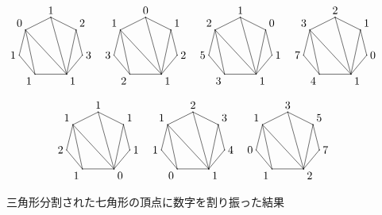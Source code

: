 \documentclass[12pt,twoside,dvipdfm]{jarticle}
\theoremstyle{definition} %
\theoremstyle{definition} %
\theoremstyle{definition} %
\numberwithin{theorem}{section}
\numberwithin{equation}{section}
\numberwithin{figure}{section}
\numberwithin{table}{section}
\begin{document}
\begin{figure}[hbp!]
\[
\begin{xy}
{<0mm,0mm>;<1mm,0mm>:
(  0, 10)*+!D {1}="1",
(  8,  6)*+!LD{2}="2", 
( 10, -2)*+!L {3}="3", 
(  5, -8)*+!LU{1}="4", 
( -5, -8)*+!UR{1}="5",
(-10, -2)*+!R {1}="6",
( -8,  6)*+!DR{0}="7", 
\ar@{-}"1";"2",
\ar@{-}"2";"3",
\ar@{-}"3";"4",
\ar@{-}"4";"5",
\ar@{-}"5";"6",
\ar@{-}"6";"7",
\ar@{-}"7";"1".
\ar@{-}"4";"2",
\ar@{-}"4";"1",
\ar@{-}"4";"7",
\ar@{-}"5";"7".
},
{<30mm,0mm>;<31mm,0mm>:
(  0, 10)*+!D {0}="1",
(  8,  6)*+!LD{1}="2", 
( 10, -2)*+!L {2}="3", 
(  5, -8)*+!LU{1}="4", 
( -5, -8)*+!UR{2}="5",
(-10, -2)*+!R {3}="6",
( -8,  6)*+!DR{1}="7", 
\ar@{-}"1";"2",
\ar@{-}"2";"3",
\ar@{-}"3";"4",
\ar@{-}"4";"5",
\ar@{-}"5";"6",
\ar@{-}"6";"7",
\ar@{-}"7";"1".
\ar@{-}"4";"2",
\ar@{-}"4";"1",
\ar@{-}"4";"7",
\ar@{-}"5";"7".
},
{<60mm,0mm>;<61mm,0mm>:
(  0, 10)*+!D {1}="1",
(  8,  6)*+!LD{0}="2", 
( 10, -2)*+!L {1}="3", 
(  5, -8)*+!LU{1}="4", 
( -5, -8)*+!UR{3}="5",
(-10, -2)*+!R {5}="6",
( -8,  6)*+!DR{2}="7", 
\ar@{-}"1";"2",
\ar@{-}"2";"3",
\ar@{-}"3";"4",
\ar@{-}"4";"5",
\ar@{-}"5";"6",
\ar@{-}"6";"7",
\ar@{-}"7";"1".
\ar@{-}"4";"2",
\ar@{-}"4";"1",
\ar@{-}"4";"7",
\ar@{-}"5";"7".
},
{<90mm,0mm>;<91mm,0mm>:
(  0, 10)*+!D {2}="1",
(  8,  6)*+!LD{1}="2", 
( 10, -2)*+!L {0}="3", 
(  5, -8)*+!LU{1}="4", 
( -5, -8)*+!UR{4}="5",
(-10, -2)*+!R {7}="6",
( -8,  6)*+!DR{3}="7", 
\ar@{-}"1";"2",
\ar@{-}"2";"3",
\ar@{-}"3";"4",
\ar@{-}"4";"5",
\ar@{-}"5";"6",
\ar@{-}"6";"7",
\ar@{-}"7";"1".
\ar@{-}"4";"2",
\ar@{-}"4";"1",
\ar@{-}"4";"7",
\ar@{-}"5";"7".
},
{<15mm,-30mm>;<16mm,-30mm>:
(  0, 10)*+!D {1}="1",
(  8,  6)*+!LD{1}="2", 
( 10, -2)*+!L {1}="3", 
(  5, -8)*+!LU{0}="4", 
( -5, -8)*+!UR{1}="5",
(-10, -2)*+!R {2}="6",
( -8,  6)*+!DR{1}="7", 
\ar@{-}"1";"2",
\ar@{-}"2";"3",
\ar@{-}"3";"4",
\ar@{-}"4";"5",
\ar@{-}"5";"6",
\ar@{-}"6";"7",
\ar@{-}"7";"1".
\ar@{-}"4";"2",
\ar@{-}"4";"1",
\ar@{-}"4";"7",
\ar@{-}"5";"7".
},
{<45mm,-30mm>;<46mm,-30mm>:
(  0, 10)*+!D {2}="1",
(  8,  6)*+!LD{3}="2", 
( 10, -2)*+!L {4}="3", 
(  5, -8)*+!LU{1}="4", 
( -5, -8)*+!UR{0}="5",
(-10, -2)*+!R {1}="6",
( -8,  6)*+!DR{1}="7", 
\ar@{-}"1";"2",
\ar@{-}"2";"3",
\ar@{-}"3";"4",
\ar@{-}"4";"5",
\ar@{-}"5";"6",
\ar@{-}"6";"7",
\ar@{-}"7";"1".
\ar@{-}"4";"2",
\ar@{-}"4";"1",
\ar@{-}"4";"7",
\ar@{-}"5";"7".
},
{<75mm,-30mm>;<76mm,-30mm>:
(  0, 10)*+!D {3}="1",
(  8,  6)*+!LD{5}="2", 
( 10, -2)*+!L {7}="3", 
(  5, -8)*+!LU{2}="4", 
( -5, -8)*+!UR{1}="5",
(-10, -2)*+!R {0}="6",
( -8,  6)*+!DR{1}="7", 
\ar@{-}"1";"2",
\ar@{-}"2";"3",
\ar@{-}"3";"4",
\ar@{-}"4";"5",
\ar@{-}"5";"6",
\ar@{-}"6";"7",
\ar@{-}"7";"1".
\ar@{-}"4";"2",
\ar@{-}"4";"1",
\ar@{-}"4";"7",
\ar@{-}"5";"7".
},
\end{xy}
\]
\caption{三角形分割された七角形の頂点に数字を割り振った結果}
\label{fig:septnum}
\end{figure}
\end{document}
